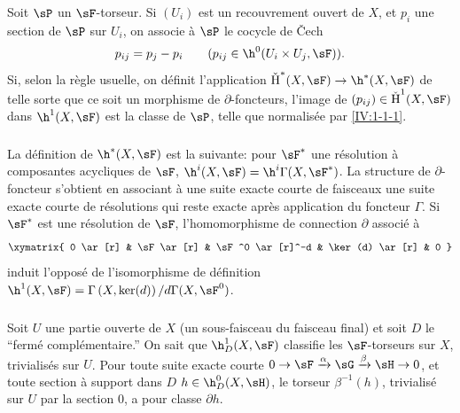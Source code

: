 \subsubsection{}\label{IV:1-1-2}

Soit $\sP$ un $\sF$-torseur. Si $(U_i)$ est un recouvrement ouvert de $X$, et 
$p_i$ une section de $\sP$ sur $U_i$, on associe à $\sP$ le cocycle de 
\v{C}ech
\[
  p_{i j} = p_j - p_i \qquad \text{($p_{i j}\in \h^0(U_i\times U_j,\sF)$).}
\]
Si, selon la règle usuelle, on définit l'application 
$\operatorname{\check H}^*(X,\sF)\to \h^*(X,\sF)$ de telle sorte 
que ce soit un morphisme de $\partial$-foncteurs, l'image de 
$(p_{i j})\in \operatorname{\check H}^1(X,\sF)$ dans $\h^1(X,\sF)$ est la 
classe de $\sP$, telle que normalisée par \ref{IV:1-1-1}. 





\subsubsection{}\label{IV:1-1-3}

\marginpar{!}La définition de $\h^*(X,\sF)$ est la suivante: pour $\sF^*$ une 
résolution à composantes acycliques de $\sF$, 
$\h^i(X,\sF) = \h^i\Gamma(X,\sF^*)$. La structure de $\partial$-foncteur 
s'obtient en associant à une suite exacte courte de faisceaux une suite 
exacte courte de résolutions qui reste exacte après application du 
foncteur $\Gamma$. Si $\sF^*$ est une résolution de $\sF$, 
l'homomorphisme de connection $\partial$ associé à 
\[\xymatrix{
  0 \ar[r]
    & \sF \ar[r]
    & \sF^0 \ar[r]^-d 
    & \ker(d) \ar[r] 
    & 0
}\]
induit l'opposé de l'isomorphisme de définition 
$\h^1(X,\sF) = \Gamma\left(X,\ker(d)\right)/d \Gamma(X,\sF^0)$. 





\subsubsection{}\label{IV:1-1-4}

Soit $U$ une partie ouverte de $X$ (un sous-faisceau du faisceau final) et 
soit $D$ le ``fermé complémentaire.'' On sait que $\h_D^1(X,\sF)$ 
classifie les $\sF$-torseurs sur $X$, trivialisés sur $U$. Pour toute suite 
exacte courte $0\to \sF\xrightarrow\alpha \sG\xrightarrow\beta\sH\to 0$, et 
toute section à support dans $D$ $h\in\h_D^0(X,\sH)$, le torseur 
$\beta^{-1}(h)$, trivialisé sur $U$ par la section $0$, a pour classe 
$\partial h$.

